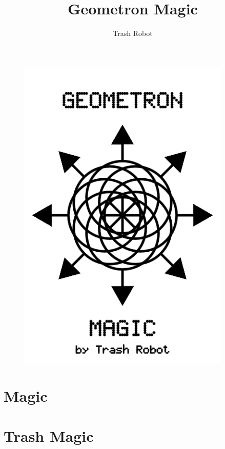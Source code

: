 \documentclass[ebook,12pt,openany]{memoir} %
\title{Geometron Magic}
\author{Trash Robot}
\begin{document}
\frontmatter
\begin{figure}[htbp]
\centering
\includegraphics[width=4in]{cover.png}
\end{figure}

\clearpage

\clearpage

\newpage
\thispagestyle{empty}
\mbox{}

\maketitle

\tableofcontents

\listoffigures 

%

\mainmatter

\chapter{Magic}

\chapter{Trash Magic}

\end{document}
